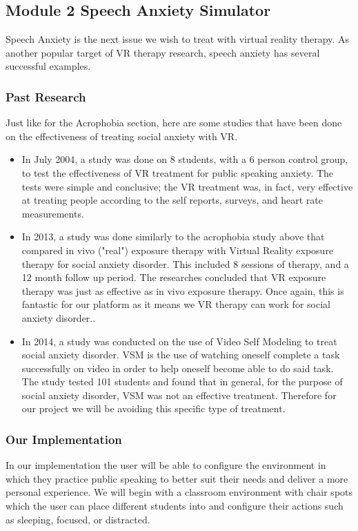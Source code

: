 \documentclass[a4paper,10pt]{article}
\begin{document}
\subsection{Module 2 Speech Anxiety Simulator}
Speech Anxiety is the next issue we wish to treat with virtual reality therapy. As another popular target of VR therapy research, speech anxiety has several successful examples.

\subsubsection{Past Research}
Just like for the Acrophobia section, here are some studies that have been done on the effectiveness of treating social anxiety with VR.
\begin{itemize}
	\item In July 2004, a study was done on 8 students, with a 6 person control group, to test the effectiveness of VR treatment for public speaking anxiety.  The tests were simple and conclusive; the VR treatment was, in fact, very effective at treating people according to the self reports, surveys, and heart rate measurements.\cite{anxOne}
	\item In 2013, a study was done similarly to the acrophobia study above that compared in vivo ("real") exposure therapy with Virtual Reality exposure therapy for social anxiety disorder.  This included 8 sessions of therapy, and a 12 month follow up period.  The researches concluded that VR exposure therapy was just as effective as in vivo exposure therapy.  Once again, this is fantastic for our platform as it means we VR therapy can work for social anxiety disorder..\cite{anxTwo}
	\item In 2014, a study was conducted on the use of Video Self Modeling to treat social anxiety disorder.  VSM is the use of watching oneself complete a task successfully on video in order to help oneself become able to do said task.  The study tested 101 students and found that in general, for the purpose of social anxiety disorder, VSM was not an effective treatment.  Therefore for our project we will be avoiding this specific type of treatment.\cite{anxThree}
\end{itemize}

\subsubsection{Our Implementation}
In our implementation the user will be able to configure the environment in which they practice public speaking to better suit their needs and deliver a more personal experience. We will begin with a classroom environment with chair spots which the user can place different students into and configure their actions such as sleeping, focused, or distracted.
\end{document}
